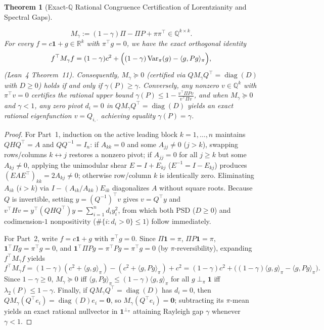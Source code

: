\documentclass[11pt,a4paper]{article}
\newtheorem{theorem}{Theorem}[section]
\theoremstyle{definition}
\theoremstyle{remark}
\newcommand{\QQ}{\mathbb{Q}}
\newcommand{\RR}{\mathbb{R}}
\newcommand{\Var}{\operatorname{Var}}
\newcommand{\diag}{\operatorname{diag}}
\begin{document}
\begin{theorem}[Exact-$\QQ$ Rational Congruence Certification of Lorentzianity and Spectral Gaps]
\begin{enumerate}[leftmargin=1.8em,itemsep=2pt]
\begin{equation}
    M_\gamma := (1 - \gamma)\Pi - \Pi P + \pi \pi^\top \in \QQ^{k\times k}.
  \end{equation}
  For every $f = c\mathbf{1} + g \in \RR^k$ with $\pi^\top g = 0$, we have the exact orthogonal identity
  \begin{equation}\label{eq:gram-id}
    f^\top M_\gamma f = (1 - \gamma) c^2 + \Bigl((1 - \gamma)\Var_\pi(g) - \langle g, P g\rangle_\pi\Bigr),
  \end{equation}
  (Lean~4 Theorem~11). Consequently, $M_\gamma \succeq 0$ (certified via $Q M_\gamma Q^\top = \diag(D)$ with $D \ge 0$) holds if and only if $\gamma(P) \ge \gamma$. Conversely, any nonzero $v \in \QQ^k$ with $\pi^\top v = 0$ certifies the rational upper bound $\gamma(P) \le 1 - \frac{v^\top \Pi P v}{v^\top \Pi v}$, and when $M_\gamma \succeq 0$ and $\gamma < 1$, any zero pivot $d_i = 0$ in $Q M_\gamma Q^\top = \diag(D)$ yields an exact rational eigenfunction $v = Q_{i,\cdot}$ achieving equality $\gamma(P) = \gamma$.
\end{enumerate}
\end{theorem}

\begin{proof}
For Part~1, induction on the active leading block $k=1,\dots,n$ maintains $Q H Q^\top = A$ and $Q Q^{-1} = I_n$: if $A_{kk}=0$ and some $A_{jj}\neq 0$ ($j>k$), swapping rows/columns $k\leftrightarrow j$ restores a nonzero pivot; if $A_{jj}=0$ for all $j\ge k$ but some $A_{kj}\neq 0$, applying the unimodular shear $E = I + E_{kj}$ ($E^{-1} = I - E_{kj}$) produces $(EAE^\top)_{kk} = 2A_{kj} \neq 0$; otherwise row/column $k$ is identically zero. Eliminating $A_{ik}$ ($i>k$) via $I - (A_{ik}/A_{kk})E_{ik}$ diagonalizes $A$ without square roots. Because $Q$ is invertible, setting $y = (Q^{-1})^\top v$ gives $v = Q^\top y$ and $v^\top H v = y^\top (Q H Q^\top) y = \sum_{i=1}^n d_i y_i^2$, from which both PSD ($D \ge 0$) and codimension-$1$ nonpositivity ($\#\{i : d_i > 0\} \le 1$) follow immediately.

For Part~2, write $f = c\mathbf{1} + g$ with $\pi^\top g = 0$. Since $\Pi \mathbf{1} = \pi$, $\Pi P \mathbf{1} = \pi$, $\mathbf{1}^\top \Pi g = \pi^\top g = 0$, and $\mathbf{1}^\top \Pi P g = \pi^\top P g = \pi^\top g = 0$ (by $\pi$-reversibility), expanding $f^\top M_\gamma f$ yields
\[
  f^\top M_\gamma f = (1-\gamma)(c^2 + \langle g, g\rangle_\pi) - (c^2 + \langle g, Pg\rangle_\pi) + c^2
  = (1-\gamma)c^2 + \bigl((1-\gamma)\langle g,g\rangle_\pi - \langle g, Pg\rangle_\pi\bigr).
\]
Since $1 - \gamma \ge 0$, $M_\gamma \succeq 0$ iff $\langle g, Pg\rangle_\pi \le (1-\gamma)\langle g,g\rangle_\pi$ for all $g \perp_\pi \mathbf{1}$ iff $\lambda_2(P) \le 1 - \gamma$. Finally, if $Q M_\gamma Q^\top = \diag(D)$ has $d_i = 0$, then $Q M_\gamma (Q^\top e_i) = \diag(D) e_i = \mathbf{0}$, so $M_\gamma (Q^\top e_i) = \mathbf{0}$; subtracting its $\pi$-mean yields an exact rational nullvector in $\mathbf{1}^{\perp_\pi}$ attaining Rayleigh gap $\gamma$ whenever $\gamma < 1$.
\end{proof}
\end{document}
